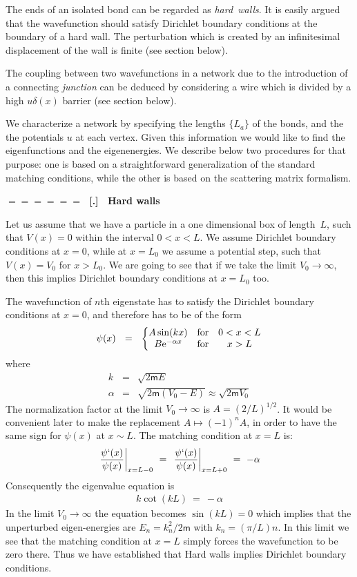 \documentclass[onecolumn,fleqn]{revtex4}
\newcommand{\eexp}{\mathrm{e}^}
\newcommand{\mass}{\mathsf{m}}
\newcommand{\amatrix}[1]{\begin{matrix} #1 \end{matrix}}
\newcommand{\beq}{\begin{eqnarray}}
\newcommand{\eeq}{\end{eqnarray}}
\renewcommand{\thesubsection}{\arabic{subsection}}
\renewcommand{\thesubsubsection}{\arabic{subsubsection}}
\newcommand{\sheadC}[1]
{
\addtocounter{subsubsection}{1}
\vspace{5mm}
{\Large\bf $=\!=\!=\!=\!=\!=\;$ [\thesubsection.\thesubsubsection] \ #1}  
\nopagebreak
\phantomsection
}
\begin{document}
The ends of an isolated bond can be regarded as {\em hard~walls}.
It is easily argued that the wavefunction should satisfy Dirichlet 
boundary conditions at the boundary of a hard wall. 
The perturbation which is created by an infinitesimal 
displacement of the wall is finite (see section below).

The coupling between two wavefunctions in a network due 
to the introduction of a connecting {\em junction} can be deduced 
by considering a wire which is divided by 
a high $u\delta(x)$ barrier (see section below).


We characterize a network by specifying the lengths $\{L_a\}$ 
of the bonds, and the the potentials $u$ at each vertex.   
Given this information we would like to find the eigenfunctions 
and the eigenenergies. 
We describe below two procedures for that purpose: 
one is based on a straightforward generalization 
of the standard matching conditions, 
while the other is based on the scattering matrix formalism.  



\sheadC{Hard walls} 
\label{sWalls}

Let us assume that we have a particle in a one dimensional box 
of length~$L$, such that ${V(x)=0}$ within the interval ${0<x<L}$. 
We assume Dirichlet boundary conditions at ${x=0}$, 
while at ${x=L_0}$ we assume a potential step, 
such that ${V(x)=V_0}$ for ${x>L_0}$. 
We are going to see that if we take the limit ${V_0 \rightarrow \infty}$, 
then this implies Dirichlet boundary conditions at ${x=L_0}$ too.  

The wavefunction of $n$th eigenstate has to 
satisfy the Dirichlet boundary conditions at ${x=0}$, 
and therefore has to be of the form     
\beq
\psi(x) \ \ = \ \ 
\left\{ \amatrix{ 
A\sin(kx)  & \mbox{for} & 0<x<L \cr
B \eexp{-\alpha x} & \mbox{for} &  x>L} 
\right. 
\eeq
where 
\beq
k &=& \sqrt{2\mass E}
\\ \nonumber
\alpha &=& \sqrt{2\mass(V_0-E)} \approx \sqrt{2\mass V_0} 
\eeq
The normalization factor 
at the limit ${V_0 \rightarrow \infty}$ 
is ${A = ({2}/{L})^{1/2} }$. 
It would be convenient later 
to make the replacement ${A \mapsto (-1)^n A}$, 
in order to have the same sign 
for $\psi(x)$ at ${x \sim L}$.   
The matching condition at ${x=L}$ is:
\beq
\left. \frac{\psi`(x)}{\psi(x)} \right|_{x=L-0} 
\,\, =\,\, 
\left. \frac{\psi`(x)}{\psi(x)} \right|_{x=L+0} 
\,\, = \,\, -\alpha 
\eeq
Consequently the eigenvalue equation is 
\beq
k\cot(kL) \ = \ -\alpha 
\eeq
In the limit ${V_0 \rightarrow \infty}$  
the equation becomes ${\sin(kL) = 0}$ 
which implies that the unperturbed 
eigen-energies are ${E_n=k_n^2/2\mass}$
with ${k_n=(\pi/L)n}$. In this limit we 
see that the matching condition 
at ${x=L}$ simply forces the wavefunction 
to be zero there. Thus we have established 
that Hard walls implies Dirichlet boundary 
conditions. 
\end{document}
